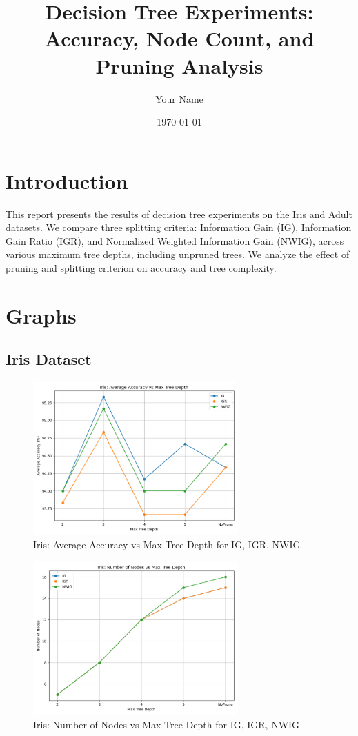 \documentclass{article}
\title{Decision Tree Experiments: Accuracy, Node Count, and Pruning Analysis}
\author{Your Name}
\date{\today}
\begin{document}
\maketitle

\section{Introduction}
This report presents the results of decision tree experiments on the Iris and Adult datasets. We compare three splitting criteria: Information Gain (IG), Information Gain Ratio (IGR), and Normalized Weighted Information Gain (NWIG), across various maximum tree depths, including unpruned trees. We analyze the effect of pruning and splitting criterion on accuracy and tree complexity.

\section{Graphs}

\subsection{Iris Dataset}

\begin{figure}[h!]
    \centering
    \includegraphics[width=0.7\textwidth]{graphs/Iris_accuracy_vs_depth.png}
    \caption{Iris: Average Accuracy vs Max Tree Depth for IG, IGR, NWIG}
\end{figure}

\begin{figure}[h!]
    \centering
    \includegraphics[width=0.7\textwidth]{graphs/Iris_nodes_vs_depth.png}
    \caption{Iris: Number of Nodes vs Max Tree Depth for IG, IGR, NWIG}
\end{figure}
\end{document}
